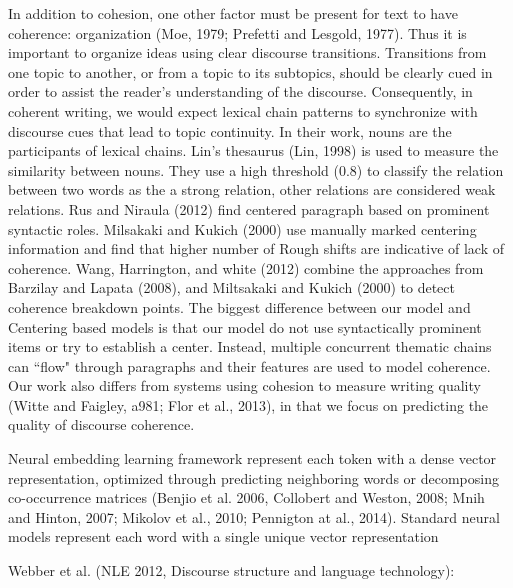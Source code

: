 In addition to cohesion, one other factor must be present for text to have coherence: organization (Moe, 1979; Prefetti and Lesgold, 1977). 
Thus it is important to organize ideas using clear discourse transitions.
Transitions from one topic to another, or from a topic to its subtopics, should be clearly cued in order to assist the reader's understanding of the discourse.
Consequently, in coherent writing, we would expect lexical chain patterns to synchronize with discourse cues that lead to topic continuity.  
In their work, nouns are the participants of lexical chains. 
Lin's thesaurus (Lin, 1998) is used to measure the similarity between nouns. 
They use a high threshold ($0.8$) to classify the relation between two words as the a strong relation, other relations are considered weak relations. 
Rus and Niraula (2012) find centered paragraph based on prominent syntactic roles. 
Milsakaki and Kukich (2000) use manually marked centering information and find that higher number of Rough shifts are indicative of lack of coherence. 
Wang, Harrington, and white (2012) combine the approaches from Barzilay and Lapata (2008), and Miltsakaki and Kukich (2000) to detect coherence breakdown points. 
The biggest difference between our model and Centering based models is that our model do not use syntactically prominent items or try to establish a center. Instead, multiple concurrent thematic chains can ``flow" through paragraphs and their features are used to model coherence. 
Our work also differs from systems using cohesion to measure writing quality (Witte and Faigley, a981; Flor et al., 2013), in that we focus on predicting the quality of discourse coherence. 



Neural embedding learning framework represent each token with a dense vector representation, optimized through predicting neighboring words or decomposing co-occurrence matrices (Benjio et al. 2006, Collobert and Weston, 2008; Mnih and Hinton, 2007; Mikolov et al., 2010; Pennigton at al., 2014).
Standard neural models represent each word with a single unique vector representation


Webber et al. (NLE 2012, Discourse structure and language technology):

